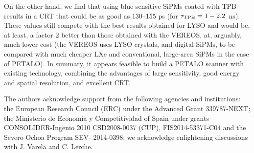 \documentclass[11pt,a4paper]{article}
\begin{document}
On the other hand, we find that using blue sensitive SiPMs coated with TPB results in a CRT that could be as good as
130--155 ps (for $\tau_{\rm{TPB}} = 1-2.2$~ns). These values still compete with the best results obtained for LYSO and would be, at least, a factor 2 better than those obtained with the VEREOS, at, arguably, much lower cost (the VEREOS uses LYSO crystals, and digital SiPMs, to be compared with much cheaper LXe and conventional, large-area SiPMs in the case of PETALO).  In summary, it appears feasible to build a PETALO scanner with existing technology, combining the advantages of large sensitivity, good energy and spatial resolution, and excellent CRT.  

\acknowledgments
The authors acknowledge support from the following agencies and institutions: the European Research Council (ERC) under the Advanced Grant 339787-NEXT; the Ministerio de Econom\'ia y Competitividad of Spain under grants CONSOLIDER-Ingenio 2010 CSD2008-0037 (CUP), FIS2014-53371-C04 and the Severo Ochoa Program SEV- 2014-0398; we acknowledge enlightening discussions with J. Varela and C. Lerche.


\end{document}
